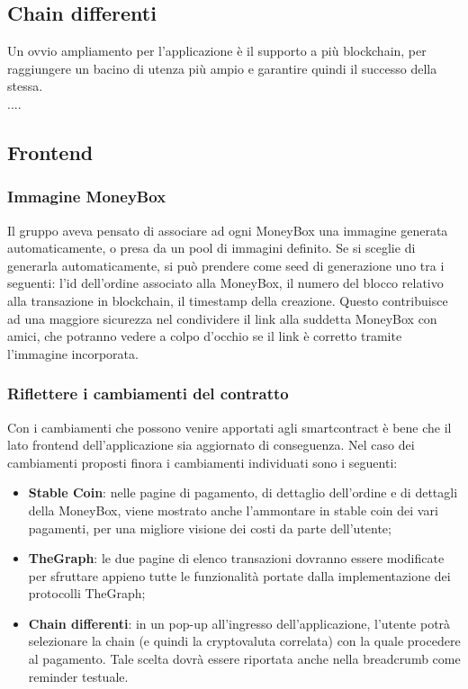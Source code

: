 \subsection{Chain differenti}

Un ovvio ampliamento per l'applicazione è il supporto a più blockchain, per raggiungere un bacino di utenza più ampio e garantire quindi il successo della stessa.\\
....

\subsection{Frontend}

\subsubsection{Immagine MoneyBox}

Il gruppo aveva pensato di associare ad ogni MoneyBox una immagine generata automaticamente, o presa da un pool di immagini definito. Se si sceglie di generarla automaticamente, si può prendere come seed di generazione uno tra i seguenti: l'id dell'ordine associato alla MoneyBox, 
il numero del blocco relativo alla transazione in blockchain, il timestamp della creazione.
Questo contribuisce ad una maggiore sicurezza nel condividere il link alla suddetta MoneyBox con amici, che potranno vedere a colpo d'occhio se il link è corretto tramite l'immagine incorporata.

\subsubsection{Riflettere i cambiamenti del contratto}

Con i cambiamenti che possono venire apportati agli smartcontract è bene che il lato frontend dell'applicazione sia aggiornato di conseguenza.
Nel caso dei cambiamenti proposti finora i cambiamenti individuati sono i seguenti:
\begin{itemize}
    \item \textbf{Stable Coin}: nelle pagine di pagamento, di dettaglio dell'ordine e di dettagli della MoneyBox, viene mostrato anche l'ammontare in stable coin dei vari pagamenti, per una migliore visione dei costi da parte dell'utente;
    \item \textbf{TheGraph}: le due pagine di elenco transazioni dovranno essere modificate per sfruttare appieno tutte le funzionalità portate dalla implementazione dei protocolli TheGraph;
    \item \textbf{Chain differenti}:  in un pop-up all'ingresso dell'applicazione, l'utente potrà selezionare la chain (e quindi la cryptovaluta correlata) con la quale procedere al pagamento. Tale scelta dovrà essere riportata anche nella breadcrumb come reminder testuale.
\end{itemize}

